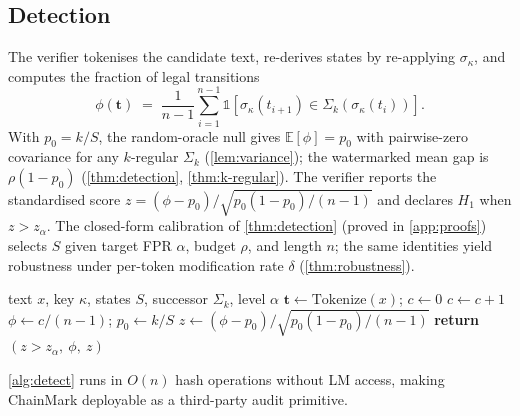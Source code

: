 \subsection{Detection}

The verifier tokenises the candidate text, re-derives states by
re-applying $\sigma_\kappa$, and computes the fraction of legal transitions
\begin{equation}
  \label{eq:phi}
  \phi(\mathbf{t})
    \;=\; \frac{1}{n-1} \sum_{i=1}^{n-1}
      \mathbb{1}\!\left[\sigma_\kappa(t_{i+1}) \in \Sigma_k(\sigma_\kappa(t_i))\right].
\end{equation}
With $p_0 = k/S$, the random-oracle null gives $\mathbb{E}[\phi] =
p_0$ with pairwise-zero covariance for any $k$-regular $\Sigma_k$
(\autoref{lem:variance}); the watermarked mean gap is
$\rho(1 - p_0)$ (\autoref{thm:detection}, \autoref{thm:k-regular}).
The verifier reports the standardised score
$z = (\phi - p_0)/\sqrt{p_0(1-p_0)/(n-1)}$ and declares $H_1$ when
$z > z_\alpha$. The closed-form calibration of \autoref{thm:detection}
(proved in \autoref{app:proofs}) selects $S$ given target FPR
$\alpha$, budget $\rho$, and length $n$; the same identities yield
robustness under per-token modification rate $\delta$
(\autoref{thm:robustness}).

\begin{algorithm}[t]
  \caption{ChainMark Watermark Detection (model-free)}
  \label{alg:detect}
  \begin{algorithmic}
     text $x$, key $\kappa$, states $S$,
      successor $\Sigma_k$, level $\alpha$
    \STATE $\mathbf{t} \leftarrow \mathrm{Tokenize}(x)$;
      $c \leftarrow 0$
        \STATE $c \leftarrow c + 1$
      \ENDIF
    \ENDFOR
    \STATE $\phi \leftarrow c/(n-1)$;\;
      $p_0 \leftarrow k/S$
    \STATE $z \leftarrow (\phi - p_0)/\sqrt{p_0(1-p_0)/(n-1)}$
    \STATE \textbf{return} $(z > z_\alpha,\ \phi,\ z)$
  \end{algorithmic}
\end{algorithm}

\autoref{alg:detect} runs in $O(n)$ hash operations without LM
access, making ChainMark deployable as a third-party audit primitive.
